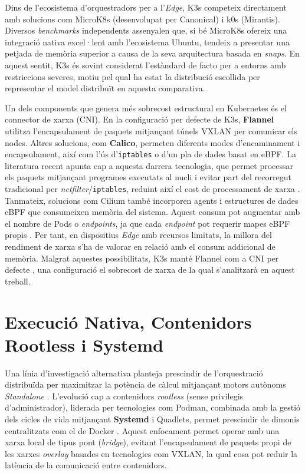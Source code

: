 Dins de l'ecosistema d'orquestradors per a l'\textit{Edge}, K3s competeix directament amb solucions com MicroK8s (desenvolupat per Canonical) i k0s (Mirantis).
Diversos \textit{benchmarks} independents assenyalen que, si bé MicroK8s ofereix una integració nativa excel·lent amb l'ecosistema Ubuntu, tendeix a presentar una petjada de memòria superior a causa de la seva arquitectura basada en \textit{snaps}.
En aquest sentit, K3s és sovint considerat l'estàndard de facto per a entorns amb restriccions severes, motiu pel qual ha estat la distribució escollida per representar el model distribuït en aquesta comparativa.

Un dels components que genera més sobrecost estructural en Kubernetes és el connector de xarxa (CNI).
En la configuració per defecte de K3s, \textbf{Flannel} utilitza l'encapsulament de paquets mitjançant túnels VXLAN per comunicar els nodes. Altres solucions, com \textbf{Calico}, permeten diferents modes d'encaminament i encapsulament, així com l'ús d'\texttt{iptables} o d'un pla de dades basat en eBPF. La literatura recent apunta cap a aquesta darrera tecnologia, que permet processar els paquets mitjançant programes executats al nucli i evitar part del recorregut tradicional per \textit{netfilter}/\texttt{iptables}, reduint així el cost de processament de xarxa \cite{koukis2024performance}.
Tanmateix, solucions com Cilium també incorporen agents i estructures de dades eBPF que consumeixen memòria del sistema. Aquest consum pot augmentar amb el nombre de Pods o \textit{endpoints}, ja que cada \textit{endpoint} pot requerir mapes eBPF propis \cite{cilium_scalability_report}. Per tant, en dispositius \textit{Edge} amb recursos limitats, la millora del rendiment de xarxa s'ha de valorar en relació amb el consum addicional de memòria. Malgrat aquestes possibilitats, K3s manté Flannel com a CNI per defecte \cite{k3s_basic_network_options}, una configuració el sobrecost de xarxa de la qual s'analitzarà en aquest treball.

\section{Execució Nativa, Contenidors Rootless i Systemd}
Una línia d'investigació alternativa planteja prescindir de l'orquestració distribuïda per maximitzar la potència de càlcul mitjançant motors autònoms \textit{Standalone} \cite{hampau2022empirical}. 
L'evolució cap a contenidors \textit{rootless} (sense privilegis d'administrador), liderada per tecnologies com Podman, combinada amb la gestió dels cicles de vida mitjançant \textbf{Systemd} i Quadlets, permet prescindir de dimonis centralitzats com el de Docker \cite{kaiser2023benchmarking}. 
Aquest enfocament permet operar amb una xarxa local de tipus pont (\textit{bridge}), evitant l'encapsulament de paquets propi de les xarxes \textit{overlay} basades en tecnologies com VXLAN, la qual cosa pot reduir la latència de la comunicació entre contenidors.

